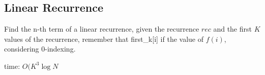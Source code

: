 \subsection{Linear Recurrence}

Find the n-th term of a linear recurrence, given the recurrence $rec$ and the first $K$ values of the recurrence, remember that first_k[i] if the value of $f(i)$, considering 0-indexing. 

time: $O(K^{3} \log{N}$
